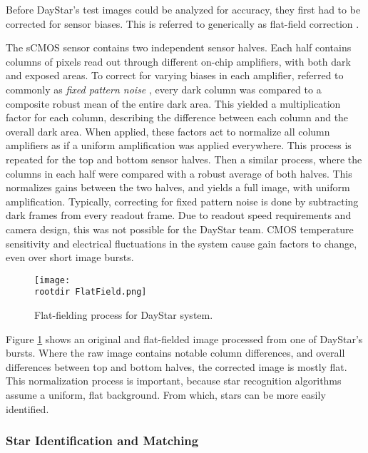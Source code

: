 \documentclass[twocolumn,letterpaper]{IEEEAerospace2012}
\newcommand{\rootdir}{./Figures/}
\begin{document}
Before DayStar's test images could be analyzed for accuracy, they first had to be corrected for sensor biases. This is referred to generically as flat-field correction \cite{flatfield}.

The sCMOS sensor contains two independent sensor halves. Each half contains columns of pixels read out through different on-chip amplifiers, with both dark and exposed areas. To correct for varying biases in each amplifier, referred to commonly as \emph{fixed pattern noise} \cite{olympusmicro}, every dark column was compared to a composite robust mean of the entire dark area. This yielded a multiplication factor for each column, describing the difference between each column and the overall dark area. When applied, these factors act to normalize all column amplifiers as if a uniform amplification was applied everywhere. This process is repeated for the top and bottom sensor halves. Then a similar process, where the columns in each half were compared with a robust average of both halves. This normalizes gains between the two halves, and yields a full image, with uniform amplification. Typically, correcting for fixed pattern noise is done by subtracting dark frames from every readout frame. Due to readout speed
requirements and camera design, this was not possible for the DayStar team. CMOS temperature sensitivity and electrical fluctuations in the system cause gain factors to change, even over short image bursts.

\begin{figure}
    \centering
    \texttt{[image: \\rootdir FlatField.png]}
    \caption{Flat-fielding process for DayStar system.}
    \label{fig:FlatField}
\end{figure}

Figure \ref{fig:FlatField} shows an original and flat-fielded image processed from one of DayStar's bursts. Where the raw image contains notable column differences, and overall differences between top and bottom halves, the corrected image is mostly flat. This normalization process is important, because star recognition algorithms assume a uniform, flat background. From which, stars can be more easily identified.

\subsubsection{Star Identification and Matching}
\end{document}
